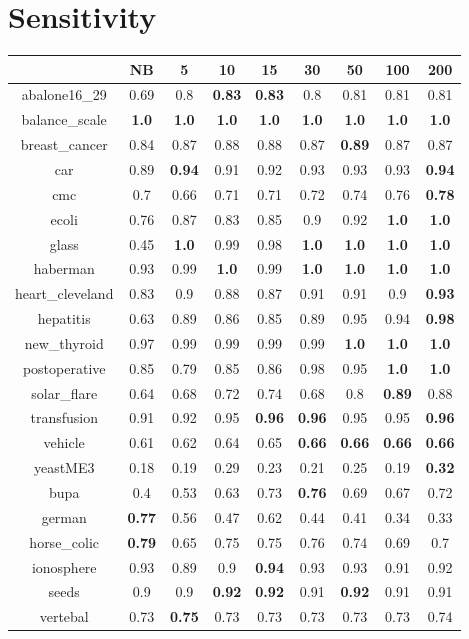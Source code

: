 \documentclass{article}%
\begin{document}
%
\section*{Sensitivity}%
\begin{tabular}{c|cccccccc}%
\hline%
&NB&5&10&15&30&50&100&200\\%
\hline%
abalone16\_29&0.69&0.8&\textbf{0.83}&\textbf{0.83}&0.8&0.81&0.81&0.81\\%
\hline%
balance\_scale&\textbf{1.0}&\textbf{1.0}&\textbf{1.0}&\textbf{1.0}&\textbf{1.0}&\textbf{1.0}&\textbf{1.0}&\textbf{1.0}\\%
\hline%
breast\_cancer&0.84&0.87&0.88&0.88&0.87&\textbf{0.89}&0.87&0.87\\%
\hline%
car&0.89&\textbf{0.94}&0.91&0.92&0.93&0.93&0.93&\textbf{0.94}\\%
\hline%
cmc&0.7&0.66&0.71&0.71&0.72&0.74&0.76&\textbf{0.78}\\%
\hline%
ecoli&0.76&0.87&0.83&0.85&0.9&0.92&\textbf{1.0}&\textbf{1.0}\\%
\hline%
glass&0.45&\textbf{1.0}&0.99&0.98&\textbf{1.0}&\textbf{1.0}&\textbf{1.0}&\textbf{1.0}\\%
\hline%
haberman&0.93&0.99&\textbf{1.0}&0.99&\textbf{1.0}&\textbf{1.0}&\textbf{1.0}&\textbf{1.0}\\%
\hline%
heart\_cleveland&0.83&0.9&0.88&0.87&0.91&0.91&0.9&\textbf{0.93}\\%
\hline%
hepatitis&0.63&0.89&0.86&0.85&0.89&0.95&0.94&\textbf{0.98}\\%
\hline%
new\_thyroid&0.97&0.99&0.99&0.99&0.99&\textbf{1.0}&\textbf{1.0}&\textbf{1.0}\\%
\hline%
postoperative&0.85&0.79&0.85&0.86&0.98&0.95&\textbf{1.0}&\textbf{1.0}\\%
\hline%
solar\_flare&0.64&0.68&0.72&0.74&0.68&0.8&\textbf{0.89}&0.88\\%
\hline%
transfusion&0.91&0.92&0.95&\textbf{0.96}&\textbf{0.96}&0.95&0.95&\textbf{0.96}\\%
\hline%
vehicle&0.61&0.62&0.64&0.65&\textbf{0.66}&\textbf{0.66}&\textbf{0.66}&\textbf{0.66}\\%
\hline%
yeastME3&0.18&0.19&0.29&0.23&0.21&0.25&0.19&\textbf{0.32}\\%
\hline%
bupa&0.4&0.53&0.63&0.73&\textbf{0.76}&0.69&0.67&0.72\\%
\hline%
german&\textbf{0.77}&0.56&0.47&0.62&0.44&0.41&0.34&0.33\\%
\hline%
horse\_colic&\textbf{0.79}&0.65&0.75&0.75&0.76&0.74&0.69&0.7\\%
\hline%
ionosphere&0.93&0.89&0.9&\textbf{0.94}&0.93&0.93&0.91&0.92\\%
\hline%
seeds&0.9&0.9&\textbf{0.92}&\textbf{0.92}&0.91&\textbf{0.92}&0.91&0.91\\%
\hline%
vertebal&0.73&\textbf{0.75}&0.73&0.73&0.73&0.73&0.73&0.74\\%
\hline%
\end{tabular}
\end{document}
